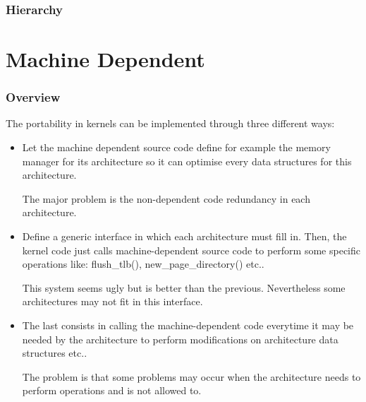 
\begin{frame}
  \frametitle{Hierarchy}

  \begin{center}
  \end{center}
\end{frame}

%
%

\section{Machine Dependent}


\begin{frame}
  \frametitle{Overview}

  The portability in kernels can be implemented through three different
  ways:

  \begin{itemize}[<+->]
    \item
      Let the machine dependent source code define for example the memory
      manager for its architecture so it can optimise every data structures
      for this architecture.

      \nl

      The major problem is the non-dependent code redundancy
      in each architecture.
    \item
      Define a generic interface in which each architecture must fill in.
      Then, the kernel code just calls machine-dependent source code
      to perform some specific operations like: flush\_tlb(),
      new\_page\_directory() etc..

      \nl

      This system seems ugly but is better than the previous. Nevertheless
      some architectures may not fit in this interface.
    \item
      The last consists in calling the machine-dependent code everytime
      it may be needed by the architecture to perform modifications on
      architecture data structures etc..

      \nl

      The problem is that some problems may occur when the architecture
      needs to perform operations and is not allowed to.
  \end{itemize}
\end{frame}


